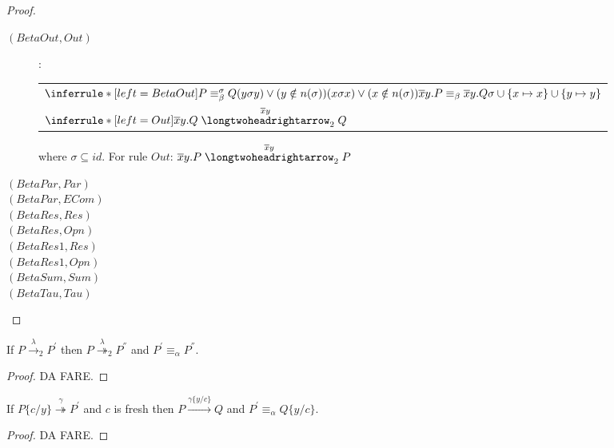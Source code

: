 \begin{lemma}
\begin{proof}
\begin{description}
      \item[$(BetaOut, Out)$]:
	\begin{center}
	  \begin{tabular}{l}
	      $\inferrule*[left=BetaOut]{
		  P\equiv_{\beta}^{\sigma}Q
		\\
		  (y \sigma y) \vee (y\notin n(\sigma))
		\\
		  (x \sigma x) \vee (x\notin n(\sigma))
	      }{
		  \overline{x}y.P\equiv_{\beta} \overline{x}y.Q
		\\
		  \sigma \cup \{x\mapsto x\} \cup \{y\mapsto y\}
	      }$
	    \\
	      $\inferrule*[left=Out]{
	      }{
		  \overline{x}y.Q \stackrel{\overline{x}y}{\longtwoheadrightarrow}_{2} Q
	      }$	      
	  \\
	  \end{tabular}
	\end{center}
	where $\sigma \subseteq id$. For rule $Out$: $\overline{x}y.P \stackrel{\overline{x}y}{\longtwoheadrightarrow}_{2} P$ 
      \item[$(BetaPar, Par)$]
      \item[$(BetaPar, ECom)$]
      \item[$(BetaRes, Res)$]
      \item[$(BetaRes, Opn)$]
      \item[$(BetaRes1, Res)$]
      \item[$(BetaRes1, Opn)$]
      \item[$(BetaSum, Sum)$]
      \item[$(BetaTau, Tau)$]
    \end{description}
  \end{proof}
\end{lemma}

\begin{lemma}\label{pushAlfaEquivalence}
  If $P\xrightarrow{\lambda}_{2} P^{'}$ then $P\stackrel{\lambda}{\twoheadrightarrow}_{2} P^{''}$ and $P^{'}\equiv_{\alpha} P^{''}$.
  \begin{proof}
    DA FARE.
  \end{proof}
\end{lemma}

\begin{lemma}\label{pushSubstitution}
  If $P\{c/y\} \stackrel{\gamma}{\twoheadrightarrow} P^{'}$ and $c$ is fresh then $P \xrightarrow{\gamma\{y/c\}} Q$ and $P^{'}\equiv_{\alpha}Q\{y/c\}$.
  \begin{proof}
    DA FARE.
  \end{proof}\end{lemma}

